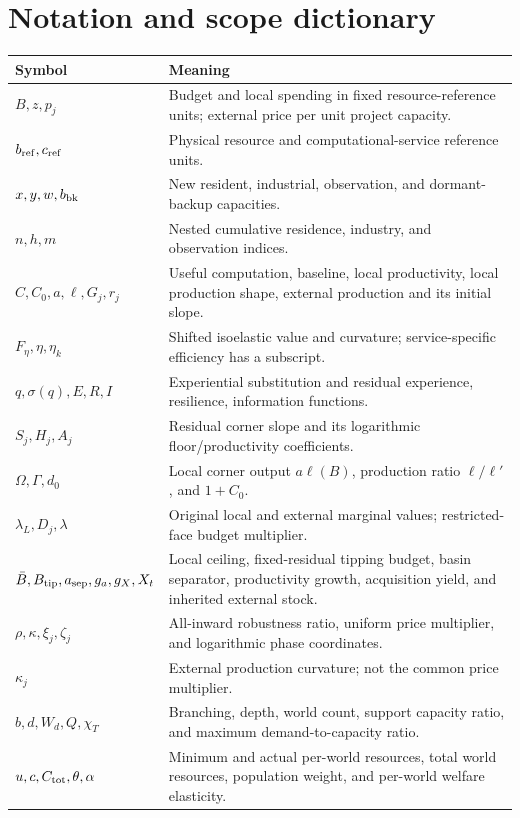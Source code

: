 \documentclass[11pt,a4paper]{article}
\theoremstyle{definition}\newtheorem{definition}{Definition}
\begin{document}
\section{Notation and scope dictionary}
\label{app:notation}
\small
\begin{longtable}{@{}p{}p{}@{}}
\toprule Symbol & Meaning\\\midrule\endhead
$B,z,p_j$ & Budget and local spending in fixed resource-reference units; external price per unit project capacity.\\
$b_{\rm ref},c_{\rm ref}$ & Physical resource and computational-service reference units.\\
$x,y,w,b_{\rm bk}$ & New resident, industrial, observation, and dormant-backup capacities.\\
$n,h,m$ & Nested cumulative residence, industry, and observation indices.\\
$C,C_0,a,\ell,G_j,r_j$ & Useful computation, baseline, local productivity, local production shape, external production and its initial slope.\\
$F_\eta,\eta,\eta_k$ & Shifted isoelastic value and curvature; service-specific efficiency has a subscript.\\
$q,\sigma(q),E,R,I$ & Experiential substitution and residual experience, resilience, information functions.\\
$S_j,H_j,A_j$ & Residual corner slope and its logarithmic floor/productivity coefficients.\\
$\Omega,\Gamma,d_0$ & Local corner output $a\ell(B)$, production ratio $\ell/\ell'$, and $1+C_0$.\\
$\lambda_L,D_j,\lambda$ & Original local and external marginal values; restricted-face budget multiplier.\\
$\bar B,B_{\rm tip},a_{\rm sep},g_a,g_X,X_t$ & Local ceiling, fixed-residual tipping budget, basin separator, productivity growth, acquisition yield, and inherited external stock.\\
$\rho,\kappa,\xi_j,\zeta_j$ & All-inward robustness ratio, uniform price multiplier, and logarithmic phase coordinates.\\
$\kappa_j$ & External production curvature; not the common price multiplier.\\
$b,d,W_d,Q,\chi_T$ & Branching, depth, world count, support capacity ratio, and maximum demand-to-capacity ratio.\\
$u,c,C_{\rm tot},\theta,\alpha$ & Minimum and actual per-world resources, total world resources, population weight, and per-world welfare elasticity.\\

\end{longtable}
\end{document}
